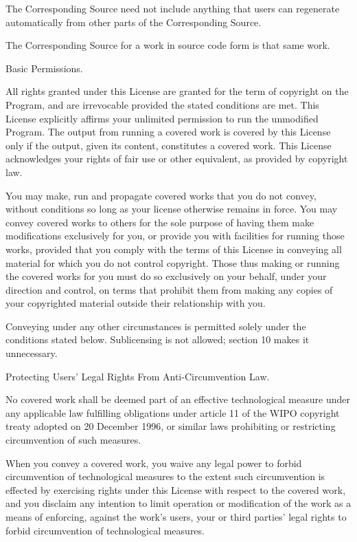 The Corresponding Source need not include anything that users can regenerate automatically from other parts of the Corresponding Source.

The Corresponding Source for a work in source code form is that same work.

\item Basic Permissions.

All rights granted under this License are granted for the term of copyright on the Program, and are irrevocable provided the stated conditions are met.  This License explicitly affirms your unlimited permission to run the unmodified Program.  The output from running a covered work is covered by this License only if the output, given its content, constitutes a covered work.  This License acknowledges your rights of fair use or other equivalent, as provided by copyright law.

You may make, run and propagate covered works that you do not convey, without conditions so long as your license otherwise remains in force.  You may convey covered works to others for the sole purpose of having them make modifications exclusively for you, or provide you with facilities for running those works, provided that you comply with the terms of this License in conveying all material for which you do not control copyright.  Those thus making or running the covered works for you must do so exclusively on your behalf, under your direction and control, on terms that prohibit them from making any copies of your copyrighted material outside their relationship with you.

Conveying under any other circumstances is permitted solely under the conditions stated below.  Sublicensing is not allowed; section 10 makes it unnecessary.

\item Protecting Users' Legal Rights From Anti-Circumvention Law.

No covered work shall be deemed part of an effective technological measure under any applicable law fulfilling obligations under article 11 of the WIPO copyright treaty adopted on 20 December 1996, or similar laws prohibiting or restricting circumvention of such measures.

When you convey a covered work, you waive any legal power to forbid circumvention of technological measures to the extent such circumvention is effected by exercising rights under this License with respect to the covered work, and you disclaim any intention to limit operation or modification of the work as a means of enforcing, against the work's users, your or third parties' legal rights to forbid circumvention of technological measures.


